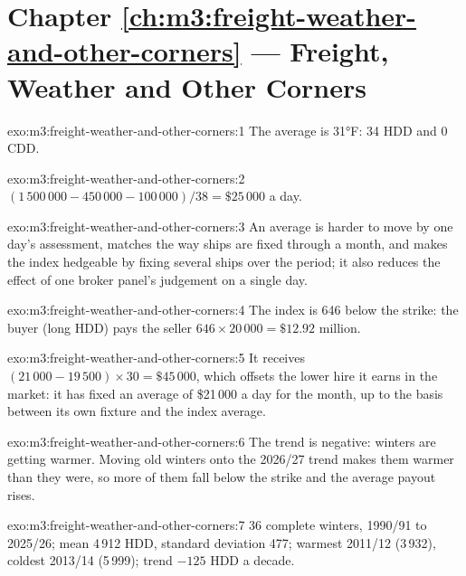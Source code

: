 \section*{Chapter \ref{ch:m3:freight-weather-and-other-corners} --- Freight, Weather and Other Corners}

\begin{solution}{exo:m3:freight-weather-and-other-corners:1}
The average is 31°F: 34 HDD and 0 CDD.
\end{solution}

\begin{solution}{exo:m3:freight-weather-and-other-corners:2}
$(1\,500\,000 - 450\,000 - 100\,000)/38 = \$25\,000$ a day.
\end{solution}

\begin{solution}{exo:m3:freight-weather-and-other-corners:3}
An average is harder to move by one day's assessment, matches the way ships are fixed through a month, and
makes the index hedgeable by fixing several ships over the period; it also reduces the effect of one broker
panel's judgement on a single day.
\end{solution}

\begin{solution}{exo:m3:freight-weather-and-other-corners:4}
The index is 646 below the strike: the buyer (long HDD) pays the seller $646 \times 20\,000 = \$12.92$
million.
\end{solution}

\begin{solution}{exo:m3:freight-weather-and-other-corners:5}
It receives $(21\,000 - 19\,500) \times 30 = \$45\,000$, which offsets the lower hire it earns in the market:
it has fixed an average of \$21\,000 a day for the month, up to the basis between its own fixture and the
index average.
\end{solution}

\begin{solution}{exo:m3:freight-weather-and-other-corners:6}
The trend is negative: winters are getting warmer. Moving old winters onto the 2026/27 trend makes them warmer
than they were, so more of them fall below the strike and the average payout rises.
\end{solution}

\begin{solution}{exo:m3:freight-weather-and-other-corners:7}
36 complete winters, 1990/91 to 2025/26; mean 4\,912 HDD, standard deviation 477; warmest 2011/12 (3\,932),
coldest 2013/14 (5\,999); trend $-125$ HDD a decade.
\end{solution}

